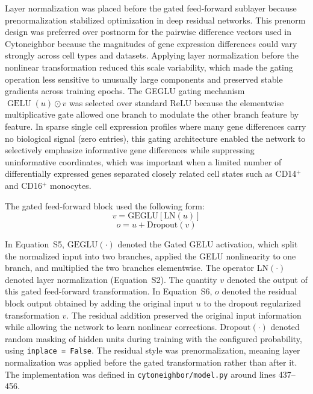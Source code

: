 \documentclass[11pt]{article}
\begin{document}
Layer normalization was placed before the gated feed-forward sublayer because prenormalization stabilized optimization in deep residual networks. This prenorm design was preferred over postnorm for the pairwise difference vectors used in Cytoneighbor because the magnitudes of gene expression differences could vary strongly across cell types and datasets. Applying layer normalization before the nonlinear transformation reduced this scale variability, which made the gating operation less sensitive to unusually large components and preserved stable gradients across training epochs. The GEGLU gating mechanism \(\operatorname{GELU}(u) \odot v\) was selected over standard ReLU because the elementwise multiplicative gate allowed one branch to modulate the other branch feature by feature. In sparse single cell expression profiles where many gene differences carry no biological signal (zero entries), this gating architecture enabled the network to selectively emphasize informative gene differences while suppressing uninformative coordinates, which was important when a limited number of differentially expressed genes separated closely related cell states such as CD14\(^{+}\) and CD16\(^{+}\) monocytes.

The gated feed-forward block used the following form:
\begin{equation}
v = \mathrm{GEGLU}\left[\mathrm{LN}(u)\right]
\label{eq:geglu_block}
\end{equation}
\begin{equation}
o = u + \mathrm{Dropout}(v)
\label{eq:residual_block}
\end{equation}

In Equation~S5, \(\mathrm{GEGLU}(\cdot)\) denoted the Gated GELU activation, which split the normalized input into two branches, applied the GELU nonlinearity to one branch, and multiplied the two branches elementwise. The operator \(\mathrm{LN}(\cdot)\) denoted layer normalization (Equation~S2). The quantity \(v\) denoted the output of this gated feed-forward transformation. In Equation~S6, \(o\) denoted the residual block output obtained by adding the original input \(u\) to the dropout regularized transformation \(v\). The residual addition preserved the original input information while allowing the network to learn nonlinear corrections. \(\mathrm{Dropout}(\cdot)\) denoted random masking of hidden units during training with the configured probability, using \texttt{inplace = False}. The residual style was prenormalization, meaning layer normalization was applied before the gated transformation rather than after it. The implementation was defined in \texttt{cytoneighbor/model.py} around lines 437--456.
\end{document}
